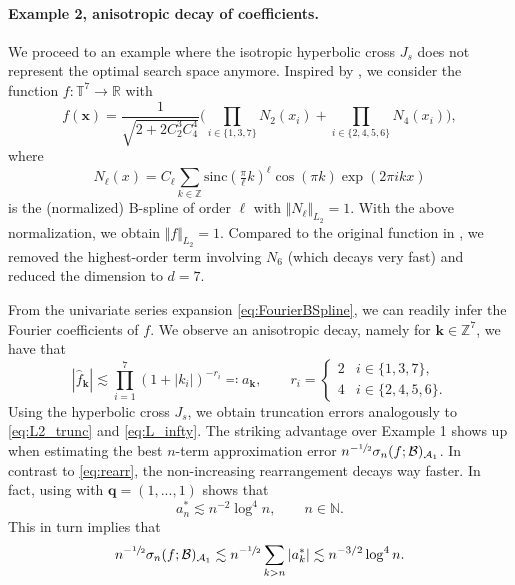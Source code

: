 \documentclass[11pt,reqno, a4paper]{article}
\numberwithin{equation}{section}
\newcommand{\Z}{\mathbb{Z}}
\newcommand{\R}{\mathbb{R}}
\begin{document}
\paragraph{Example 2, anisotropic decay of coefficients.}
We proceed to an example where the isotropic hyperbolic cross $J_{s}$ does not represent the optimal search space anymore.
Inspired by \cite[Sec.\ 5.3]{KamPotVol2021}, we consider the function $f \colon \mathbb{T}^7 \to \R$ with
\begin{equation}
    f(\mathbf x) = \frac{1}{\sqrt{2 + 2 C_2^3 C_4^4}} \biggl(\prod_{i \in \{1,3,7\}} N_2(x_i) + \prod_{i \in \{2,4,5,6\}} N_4(x_i)\biggr),
\end{equation}
where
\begin{equation}\label{eq:FourierBSpline}
    N_\ell(x) = C_\ell \sum_{k \in \Z} \mathrm{sinc}(\tfrac{\pi}{\ell}k)^\ell \cos(\pi k) \exp(2 \pi i k x)
\end{equation}
is the (normalized) B-spline of order $\ell$ with $\Vert N_\ell \Vert_{L_2} = 1$.
With the above normalization, we obtain $\Vert f \Vert_{L_2} = 1$.
Compared to the original function in \cite{KamPotVol2021}, we removed the highest-order term involving $N_6$ (which decays very fast) and reduced the dimension to $d=7$.
 
From the univariate series expansion \eqref{eq:FourierBSpline}, we can readily infer the Fourier coefficients of $f$. We observe an anisotropic decay, namely for $\mathbf{k}\in \mathbb{Z}^7$, we have that
\begin{equation}
    |\hat{f}_{\mathbf{k}}| \lesssim \prod\limits_{i=1}^7 (1+|k_i|)^{-r_i} \eqcolon a_{\mathbf{k}}, \qquad r_i = \begin{cases}
            2& i \in \{1,3,7\},\\
            4& i \in \{2,4,5,6\}.
    \end{cases}
\end{equation}
Using the hyperbolic cross $J_s$, we obtain truncation errors analogously to \eqref{eq:L2_trunc} and \eqref{eq:L_infty}.
The striking advantage over Example 1 shows up when estimating the best $n$-term approximation error $n^{-\sfrac{1}{2}} \sigma_n(f;\mathcal{B})_{\mathcal{A}_1}$.
In contrast to \eqref{eq:rearr}, the non-increasing rearrangement decays way faster.
In fact, using \cite[Thm.\ 3.4]{KSU21} with $\mathbf{q}= (1,...,1)$ shows that
\begin{equation}\label{eq:CoeffsFun2}
    a_n^{\ast} \lesssim n^{-2}\log^{4} n,\qquad n\in \mathbb{N}.
\end{equation}
This in turn implies that
\begin{equation}
    n^{-\sfrac{1}{2}} \sigma_n(f;\mathcal{B})_{\mathcal{A}_1} \lesssim
    n^{-\sfrac{1}{2}} \sum\limits_{k>n}|a_k^{\ast}| \lesssim n^{-3/2}\log^{4} n.
\end{equation}
\end{document}
